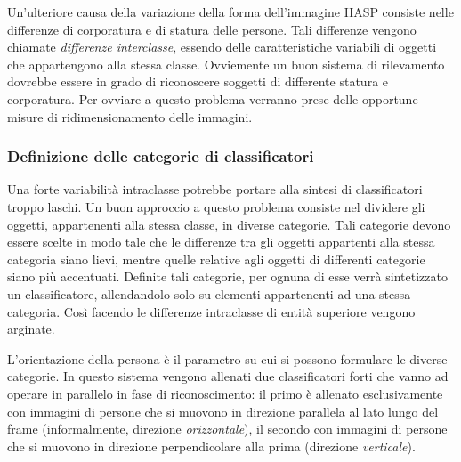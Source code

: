                 Un'ulteriore causa della variazione della forma dell'immagine HASP consiste nelle differenze di corporatura e di statura delle persone.
                Tali differenze vengono chiamate \emph{differenze interclasse}, essendo delle caratteristiche variabili di oggetti che appartengono alla stessa classe.
                Ovviemente un buon sistema di rilevamento dovrebbe essere in grado di riconoscere soggetti di differente statura e corporatura.
                Per ovviare a questo problema verranno prese delle opportune misure di ridimensionamento delle immagini.

            \subsubsection{Definizione delle categorie di classificatori}
                Una forte variabilità intraclasse potrebbe portare alla sintesi di classificatori troppo laschi.
                Un buon approccio a questo problema consiste nel dividere gli oggetti, appartenenti alla stessa classe, in diverse categorie.
                Tali categorie devono essere scelte in modo tale che le differenze tra gli oggetti appartenti alla stessa categoria siano lievi, mentre quelle relative agli oggetti di differenti categorie siano più accentuati.
                Definite tali categorie, per ognuna di esse verrà sintetizzato un classificatore, allendandolo solo su elementi appartenenti ad una stessa categoria.
                Così facendo le differenze intraclasse di entità superiore vengono arginate.

                L'orientazione della persona è il parametro su cui si possono formulare le diverse categorie.
                In questo sistema vengono allenati due classificatori forti che vanno ad operare in parallelo in fase di riconoscimento: il primo è allenato esclusivamente con immagini di persone che si muovono in direzione parallela al lato lungo del frame (informalmente, direzione \emph{orizzontale}), il secondo con immagini di persone che si muovono in direzione perpendicolare alla prima (direzione \emph{verticale}).

